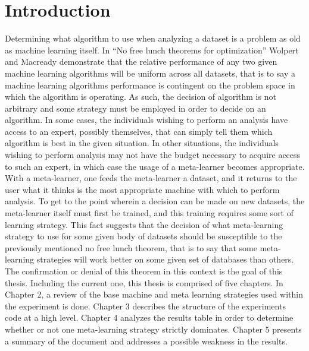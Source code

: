 \chapter{Introduction}
\label{Introduction}
Determining what algorithm to use when analyzing a dataset is a problem as
old as machine learning itself. In ``No free lunch theorems for optimization''
Wolpert and Macready demonstrate that the relative performance of any two given
machine learning algorithms will be uniform across all datasets, that is to say
a machine learning algorithms performance is contingent on the problem space in
which the algorithm is operating. As such, the decision of algorithm is not
arbitrary and some strategy must be employed in order to decide
on an algorithm. In some cases, the individuals wishing to perform an analysis
have access to an expert, possibly themselves, that can simply tell them which
algorithm is best in the given situation. In other situations, the individuals
wishing to perform analysis may not have the budget necessary to acquire access
to such an expert, in which case the usage of a meta-learner becomes appropriate.
With a meta-learner, one feeds the meta-learner a dataset, and it returns to the
user what it thinks is the most appropriate machine with which to perform
analysis. To get to the point wherein a decision can be made on new datasets, the
meta-learner itself must first be trained, and this training requires some
sort of learning strategy. This fact suggests that the decision of what
meta-learning strategy to use for some given body of datasets should be
susceptible to the previously mentioned no free lunch theorem, that is to say
that some meta-learning strategies will work better on some given set of
databases than others. The confirmation or denial of this theorem in this
context is the goal of this thesis. Including the current one, this thesis is
comprised of five chapters. In Chapter 2, a review of the base machine and meta
learning strategies used within the experiment is done. Chapter 3 describes the
structure of the experiments code at a high level. Chapter 4 analyzes the
results table in order to determine whether or not one meta-learning strategy
strictly dominates. Chapter 5 presents a summary of the document and addresses a
possible weakness in the results.
